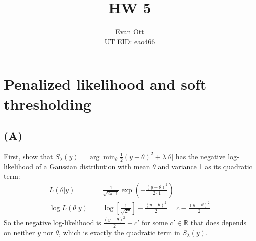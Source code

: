 \documentclass{article}
\title{\vspace{-6ex}HW 5\vspace{-2ex}}
\author{Evan Ott \\ UT EID: eao466\vspace{-2ex}}
\begin{document}
\maketitle

\section{Penalized likelihood and soft thresholding}
\subsection{(A)}
First, show that $S_\lambda(y)=\arg\min_\theta \frac{1}{2}(y-\theta)^2+\lambda|\theta|$ has the negative log-likelihood
of a Gaussian distribution with mean $\theta$ and variance 1 as its quadratic term:
\begin{align*}
L(\theta | y) &= \frac{1}{\sqrt{2\pi\cdot 1}}\exp\left(-\frac{(y-\theta)^2}{2\cdot 1}\right)\\
\log L(\theta | y) &= \log\left[\frac{1}{\sqrt{2\pi}}\right]  -\frac{(y-\theta)^2}{2} = c - \frac{(y-\theta)^2}{2}
\end{align*}
So the negative log-likelihood is $\frac{(y-\theta)^2}{2} + c'$ for some $c'\in\mathbb{R}$ that does depends on neither $y$ nor $\theta$, which is exactly the quadratic term in $S_\lambda(y)$.
\end{document}
